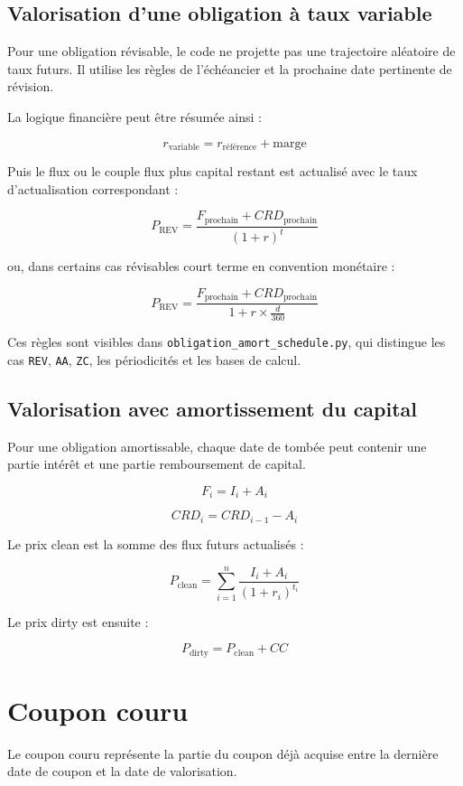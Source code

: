 \documentclass[12pt,a4paper]{article}
\begin{document}
\subsection{Valorisation d'une obligation à taux variable}

Pour une obligation révisable, le code ne projette pas une trajectoire aléatoire de taux futurs. Il utilise les règles de l'échéancier et la prochaine date pertinente de révision.

La logique financière peut être résumée ainsi :

\[
r_{\text{variable}} = r_{\text{référence}} + \text{marge}
\]

Puis le flux ou le couple flux plus capital restant est actualisé avec le taux d'actualisation correspondant :

\[
P_{\text{REV}}
=
\frac{F_{\text{prochain}} + CRD_{\text{prochain}}}
{(1+r)^{t}}
\]

ou, dans certains cas révisables court terme en convention monétaire :

\[
P_{\text{REV}}
=
\frac{F_{\text{prochain}} + CRD_{\text{prochain}}}
{1+r \times \frac{d}{360}}
\]

Ces règles sont visibles dans \texttt{obligation\_amort\_schedule.py}, qui distingue les cas \texttt{REV}, \texttt{AA}, \texttt{ZC}, les périodicités et les bases de calcul.

\subsection{Valorisation avec amortissement du capital}

Pour une obligation amortissable, chaque date de tombée peut contenir une partie intérêt et une partie remboursement de capital.

\[
F_i = I_i + A_i
\]

\[
CRD_i = CRD_{i-1} - A_i
\]

Le prix clean est la somme des flux futurs actualisés :

\[
P_{\text{clean}}
=
\sum_{i=1}^{n}
\frac{I_i + A_i}{(1+r_i)^{t_i}}
\]

Le prix dirty est ensuite :

\[
P_{\text{dirty}} = P_{\text{clean}} + CC
\]

\section{Coupon couru}

Le coupon couru représente la partie du coupon déjà acquise entre la dernière date de coupon et la date de valorisation.
\end{document}

